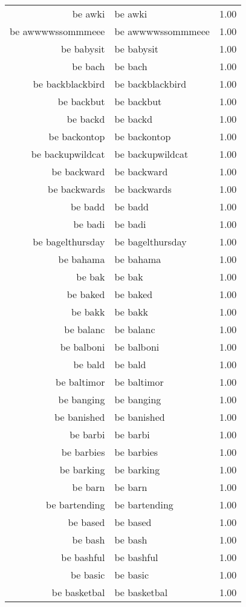 \begin{table}[ht]
\begin{tabular}{rlr}
  be awki & be awki & 1.00 \\ 
  be awwwwssommmeee & be awwwwssommmeee & 1.00 \\ 
  be babysit & be babysit & 1.00 \\ 
  be bach & be bach & 1.00 \\ 
  be backblackbird & be backblackbird & 1.00 \\ 
  be backbut & be backbut & 1.00 \\ 
  be backd & be backd & 1.00 \\ 
  be backontop & be backontop & 1.00 \\ 
  be backupwildcat & be backupwildcat & 1.00 \\ 
  be backward & be backward & 1.00 \\ 
  be backwards & be backwards & 1.00 \\ 
  be badd & be badd & 1.00 \\ 
  be badi & be badi & 1.00 \\ 
  be bagelthursday & be bagelthursday & 1.00 \\ 
  be bahama & be bahama & 1.00 \\ 
  be bak & be bak & 1.00 \\ 
  be baked & be baked & 1.00 \\ 
  be bakk & be bakk & 1.00 \\ 
  be balanc & be balanc & 1.00 \\ 
  be balboni & be balboni & 1.00 \\ 
  be bald & be bald & 1.00 \\ 
  be baltimor & be baltimor & 1.00 \\ 
  be banging & be banging & 1.00 \\ 
  be banished & be banished & 1.00 \\ 
  be barbi & be barbi & 1.00 \\ 
  be barbies & be barbies & 1.00 \\ 
  be barking & be barking & 1.00 \\ 
  be barn & be barn & 1.00 \\ 
  be bartending & be bartending & 1.00 \\ 
  be based & be based & 1.00 \\ 
  be bash & be bash & 1.00 \\ 
  be bashful & be bashful & 1.00 \\ 
  be basic & be basic & 1.00 \\ 
  be basketbal & be basketbal & 1.00 \\ 

\end{tabular}
\end{table}
